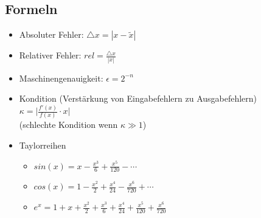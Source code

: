 \subsection{Formeln}
\begin{itemize}

	\item Absoluter Fehler: $\bigtriangleup x = |x - \widetilde{x}|$
	
	\item Relativer Fehler: $rel = \frac{\bigtriangleup x}{|x|}$
	
	\item Maschinengenauigkeit: $\epsilon = 2^{-n}$
	
	\item Kondition (Verstärkung von Eingabefehlern zu Ausgabefehlern) \\
	$\kappa = \bigg|\frac{f'(x)}{f(x)} \cdot x\bigg|$\\
	(schlechte Kondition wenn $\kappa \gg 1$)
	
	\item Taylorreihen
	\begin{itemize}
		\item $sin(x) = x - \frac{x^3}{6} + \frac{x^5}{120} - \cdots$
		\item $cos(x) = 1 - \frac{x^2}{2} + \frac{x^4}{24} - \frac{x^6}{720} + \cdots$
		\item $e^x = 1 + x + \frac{x^2}{2} + \frac{x^3}{6} + \frac{x^4}{24} + \frac{x^5}{120} + \frac{x^6}{720}$
	\end{itemize}

\end{itemize}

